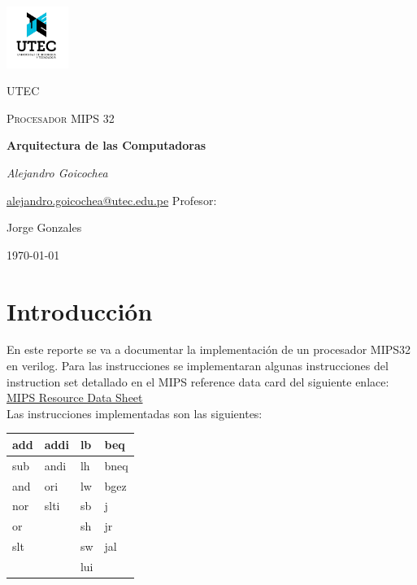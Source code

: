 \documentclass[12pt,a4paper]{article}
\begin{document}
\begin{titlepage}
	\centering
	\includegraphics[width=0.15\textwidth]{utec.png}\par\vspace{1cm}
	{\scshape\LARGE UTEC \par}
	\vspace{1cm}
	{\scshape\Large Procesador MIPS 32\par}
	\vspace{1.5cm}
	{\huge\bfseries Arquitectura de las Computadoras\par}
	\vspace{2cm}
	{\Large\itshape Alejandro Goicochea\par}
	\href{mailto:alejandro.goicochea@utec.edu.pe}{alejandro.goicochea@utec.edu.pe}
	\vfill
	Profesor:\par
	Jorge Gonzales

	\vfill
	{\large \today\par}
\end{titlepage}

\section{Introducción}
En este reporte se va a documentar la implementación de un procesador MIPS32 en verilog. Para las instrucciones se implementaran algunas instrucciones del instruction set detallado en el MIPS reference data card del siguiente enlace:
\href{https://inst.eecs.berkeley.edu/~cs61c/resources/MIPS_Green_Sheet.pdf}{MIPS Resource Data Sheet}\\
Las instrucciones implementadas son las siguientes:\\

\begin{table}[htb]
\begin{center}
\begin{tabular}{|l|l|l|l|}
\hline
add & addi & lb  & beq  \\ \hline
sub & andi & lh  & bneq \\ \hline
and & ori  & lw  & bgez \\ \hline
nor & slti & sb  & j    \\ \hline
or  &      & sh  & jr   \\ \hline
slt &      & sw  & jal  \\ \hline
    &      & lui &      \\ \hline
\end{tabular}
\end{center}
\end{table}
\end{document}
